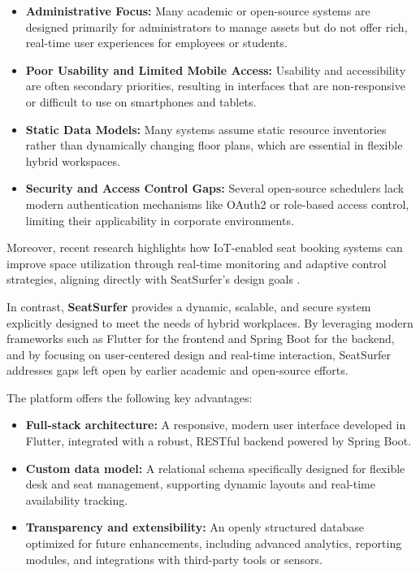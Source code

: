 \documentclass[12pt,a4paper]{report} %
\begin{document}
\begin{itemize}
\item \textbf{Administrative Focus:} Many academic or open-source systems are designed primarily for administrators to manage assets but do not offer rich, real-time user experiences for employees or students.
\item \textbf{Poor Usability and Limited Mobile Access:} Usability and accessibility are often secondary priorities, resulting in interfaces that are non-responsive or difficult to use on smartphones and tablets.
\item \textbf{Static Data Models:} Many systems assume static resource inventories rather than dynamically changing floor plans, which are essential in flexible hybrid workspaces.
\item \textbf{Security and Access Control Gaps:} Several open-source schedulers lack modern authentication mechanisms like OAuth2 or role-based access control, limiting their applicability in corporate environments.
\end{itemize}

Moreover, recent research highlights how IoT-enabled seat booking systems can improve space utilization through real-time monitoring and adaptive control strategies, aligning directly with SeatSurfer's design goals \cite{rahman2020iot}.

In contrast, \textbf{SeatSurfer} provides a dynamic, scalable, and secure system explicitly designed to meet the needs of hybrid workplaces. By leveraging modern frameworks such as Flutter for the frontend and Spring Boot for the backend, and by focusing on user-centered design and real-time interaction, SeatSurfer addresses gaps left open by earlier academic and open-source efforts.

The platform offers the following key advantages:
\begin{itemize}
\item \textbf{Full-stack architecture:} A responsive, modern user interface developed in Flutter, integrated with a robust, RESTful backend powered by Spring Boot.
\item \textbf{Custom data model:} A relational schema specifically designed for flexible desk and seat management, supporting dynamic layouts and real-time availability tracking.
\item \textbf{Transparency and extensibility:} An openly structured database optimized for future enhancements, including advanced analytics, reporting modules, and integrations with third-party tools or sensors.
\end{itemize}
\end{document}
